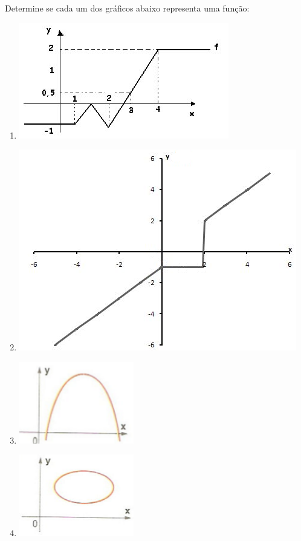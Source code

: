 	\item Determine se cada um dos gráficos abaixo representa uma função:
	\begin{multicols}{2}
	\begin{enumerate}
		\item \includegraphics[scale=0.6]{figuras/fig10}
		\item \includegraphics[scale=0.4]{figuras/fig11}
		\item \includegraphics[scale=0.9]{figuras/fig12}
		\item \includegraphics[scale=0.9]{figuras/fig13}			
	\end{enumerate}
	\end{multicols}	
	
